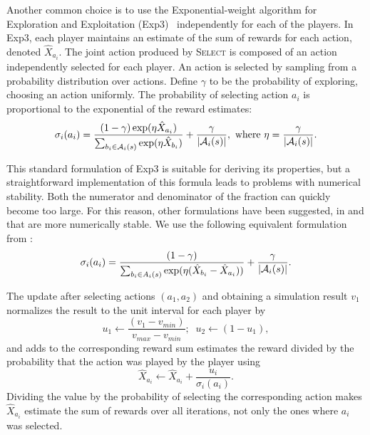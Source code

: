 Another common choice is to use the Exponential-weight algorithm for Exploration and Exploitation (Exp3)~\cite{Auer2003Exp3} independently for each of the players.
In Exp3, each player maintains an estimate of the sum of rewards for each action, denoted $\hat{X}_{a_i}$.
The joint action produced by \textsc{Select} is composed of an action independently selected for each player.
An action is selected by sampling from a probability distribution over actions.
Define $\gamma$ to be the probability of exploring, \ie choosing an action uniformly.
The probability of selecting action $a_i$ is proportional to the exponential of the reward estimates:
\begin{equation}\label{eq:exp3select}
\sigma_i(a_i) = \frac{(1-\gamma) \exp(\eta \hat{X}_{a_i})}{\sum_{b_i \in \mathcal{A}_i(s)} \exp(\eta \hat{X}_{b_i})} + \frac{\gamma}{|\mathcal{A}_i(s)|},
  \mbox{ where } \eta = \frac{\gamma}{|\mathcal{A}_i(s)|}.
\end{equation}

This standard formulation of Exp3 is suitable for deriving its properties, but a straightforward implementation of this formula leads to problems with numerical stability. Both the numerator and denominator of the fraction can quickly become too large. For this reason, other formulations have been suggested, \eg in \cite{Lanctot13Goofspiel} and \cite{Cowling12ISMCTS} that are more numerically stable. We use the following equivalent formulation from \cite{Cowling12ISMCTS}:
\begin{equation} \label{eq:exp3:stable}
\sigma_i(a_i) = \frac{(1-\gamma)}{\sum_{b_i \in A_i(s)}\exp(\eta(\hat{X}_{b_i}-\hat{X}_{a_i}))} + \frac{\gamma}{|\mathcal{A}_i(s)|}.
\end{equation}

The update after selecting actions $(a_1,a_2)$ and obtaining a simulation result $v_1$ normalizes the result to the unit interval for each player by
\begin{equation}
u_1 \leftarrow \frac{(v_1 - v_{min})}{v_{max} - v_{min}};\;\; u_2 \leftarrow (1-u_1),
\end{equation}
and adds to the corresponding reward sum estimates the reward divided by the probability that the action was played by the player using
\begin{equation}
\hat{X}_{a_i} \leftarrow \hat{X}_{a_i} + \frac{u_i}{\sigma_i(a_i)}.
\end{equation}
Dividing the value by the probability of selecting the corresponding action makes $\hat{X}_{a_i}$ estimate the sum of rewards over all
iterations, not only the ones where $a_i$ was selected.

